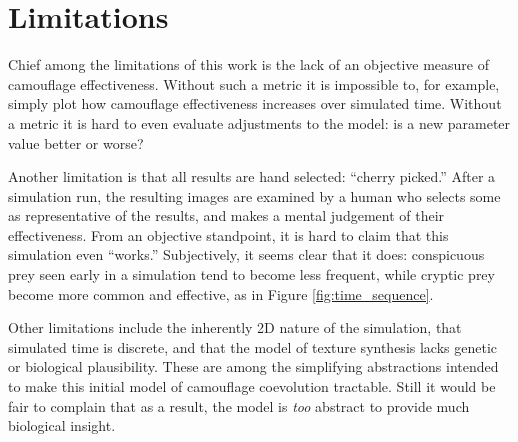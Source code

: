 \documentclass[acmtog,
    anonymous,
    review
    ]{acmart}
\begin{document}

\section{Limitations}
\label{subsec:limitations}
Chief among the limitations of this work is the lack of an objective measure of camouflage effectiveness. Without such a metric it is impossible to, for example, simply plot how camouflage effectiveness increases over simulated time. Without a metric it is hard to even evaluate adjustments to the model: is a new parameter value better or worse?
\par
Another limitation is that all results are hand selected: “cherry picked.” After a simulation run, the resulting images are examined by a human who selects some as representative of the results, and makes a mental judgement of their effectiveness. From an objective standpoint, it is hard to claim that this simulation even “works.” Subjectively, it seems clear that it does: conspicuous prey seen early in a simulation tend to become less frequent, while cryptic prey become more common and effective, as in Figure \ref{fig:time_sequence}.
\par
Other limitations include the inherently 2D nature of the simulation, that simulated time is discrete, and that the model of texture synthesis lacks genetic or biological plausibility. These are among the simplifying abstractions intended to make this initial model of camouflage coevolution tractable. Still it would be fair to complain that as a result, the model is \textit{too} abstract to provide much biological insight.
\par

\end{document}
